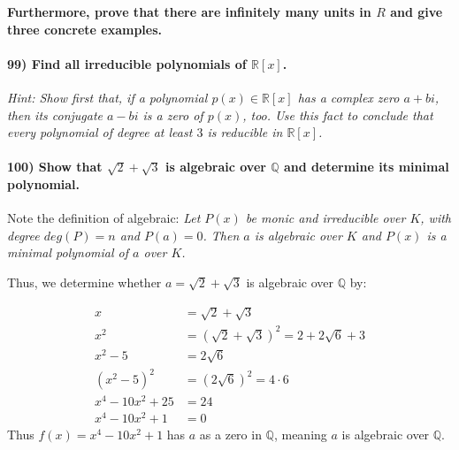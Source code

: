\documentclass[
]{article}
\begin{document}
\textbf{Furthermore, prove that there are infinitely many units in \(R\)
and give three concrete examples.}

\hypertarget{find-all-irreducible-polynomials-of-mathbbrx.}{%
\paragraph{\texorpdfstring{99) Find all irreducible polynomials of
\(\mathbb{R}[x]\).}{99) Find all irreducible polynomials of \textbackslash mathbb\{R\}{[}x{]}.}}\label{find-all-irreducible-polynomials-of-mathbbrx.}}

\emph{Hint: Show first that, if a polynomial \(p(x) \in \mathbb{R}[x]\)
has a complex zero \(a+bi\), then its conjugate \(a-bi\) is a zero of
\(p(x)\), too. Use this fact to conclude that every polynomial of degree
at least \(3\) is reducible in \(\mathbb{R}[x]\).}

\hypertarget{show-that-sqrt2-sqrt3-is-algebraic-over-mathbbq-and-determine-its-minimal-polynomial.}{%
\paragraph{\texorpdfstring{100) Show that \(\sqrt{2} + \sqrt{3}\) is
algebraic over \(\mathbb{Q}\) and determine its minimal
polynomial.}{100) Show that \textbackslash sqrt\{2\} + \textbackslash sqrt\{3\} is algebraic over \textbackslash mathbb\{Q\} and determine its minimal polynomial.}}\label{show-that-sqrt2-sqrt3-is-algebraic-over-mathbbq-and-determine-its-minimal-polynomial.}}

Note the definition of algebraic: \emph{Let \(P(x)\) be monic and
irreducible over \(K\), with degree \(deg(P) = n\) and \(P(a) = 0\).
Then \(a\) is algebraic over \(K\) and \(P(x)\) is a minimal polynomial
of \(a\) over \(K\).}

Thus, we determine whether \(a = \sqrt{2} + \sqrt{3}\) is algebraic over
\(\mathbb{Q}\) by:

\[
\begin{aligned}
x   &= \sqrt{2} + \sqrt{3}\\
x^2 &= (\sqrt{2} + \sqrt{3})^2 = 2 + 2 \sqrt{6} + 3\\
x^2 - 5 &= 2 \sqrt{6}\\
(x^2 - 5)^2 &= (2 \sqrt{6})^2 = 4 \cdot 6\\
x^4 -10x^2 + 25 &= 24\\
x^4 -10x^2 + 1 &= 0
\end{aligned}
\] Thus \(f(x) = x^4 -10x^2 + 1\) has \(a\) as a zero in \(\mathbb{Q}\),
meaning \(a\) is algebraic over \(\mathbb{Q}\).
\end{document}
